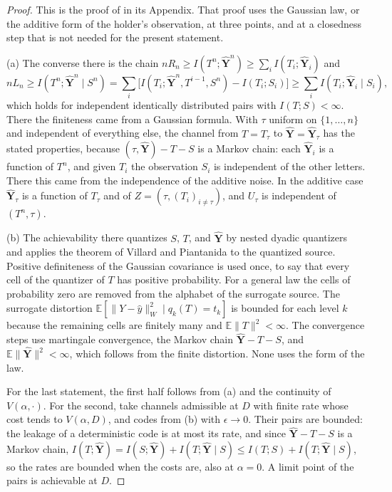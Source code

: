 \documentclass[11pt,onecolumn]{IEEEtran}
\newcommand{\E}{\mathbb{E}}
\newcommand{\hY}{\hat{\mathbf Y}}
\begin{document}
\begin{proof}
This is the proof of \cite[Theorem~3]{part1} in its Appendix. That
proof uses the Gaussian law, or the additive form of the holder's
observation, at three points, and at a closedness step that is not
needed for the present statement.

(a) The converse there is the chain
$nR_n\ge I(T^n;\hY^n)\ge\sum_iI(T_i;\hY_i)$ and
\[
nL_n\ge I(T^n;\hY^n\mid S^n)=\sum_i\bigl[I(T_i;\hY^n,T^{i-1},S^n)-I(T_i;S_i)\bigr]\ge\sum_iI(T_i;\hY_i\mid S_i),
\]
which holds for independent identically distributed pairs with
$I(T;S)<\infty$. There the finiteness came from a Gaussian formula.
With $\tau$ uniform on $\{1,\dots,n\}$ and independent
of everything else, the channel from $T=T_\tau$ to $\hY=\hY_\tau$ has
the stated properties, because $(\tau,\hY)-T-S$ is a Markov chain: each
$\hY_i$ is a function of $T^n$, and given $T_i$ the observation $S_i$
is independent of the other letters. There this came from the
independence of the additive noise. In the additive case $\hY_\tau$ is
a function of $T_\tau$ and of $Z=(\tau,(T_i)_{i\ne\tau})$, and $U_\tau$
is independent of $(T^n,\tau)$.

(b) The achievability there quantizes $S$, $T$, and $\hY$ by nested
dyadic quantizers and applies the theorem of Villard and Piantanida
\cite{villard2013} to the quantized source. Positive definiteness of
the Gaussian covariance is used once, to say that every cell of the
quantizer of $T$ has positive probability. For a general law the cells
of probability zero are removed from the alphabet of the surrogate
source. The surrogate distortion
$\E[\|Y-\hat y\|_W^2\mid q_k(T)=t_k]$ is bounded for each level $k$
because the remaining cells are finitely many and $\E\|T\|^2<\infty$.
The convergence steps use martingale convergence, the Markov chain
$\hY-T-S$, and $\E\|\hY\|^2<\infty$, which follows from the finite
distortion. None uses the form of the law.

For the last statement, the first half follows from (a) and the
continuity of $V(\alpha,\cdot)$. For the second, take channels
admissible at $D$ with finite rate whose cost tends to $V(\alpha,D)$,
and codes from (b) with $\epsilon\to0$. Their pairs are bounded: the
leakage of a deterministic code is at most its rate, and since
$\hY-T-S$ is a Markov chain,
$I(T;\hY)=I(S;\hY)+I(T;\hY\mid S)\le I(T;S)+I(T;\hY\mid S)$, so the rates
are bounded when the costs are, also at $\alpha=0$. A limit point of
the pairs is achievable at $D$.
\end{proof}
\end{document}
